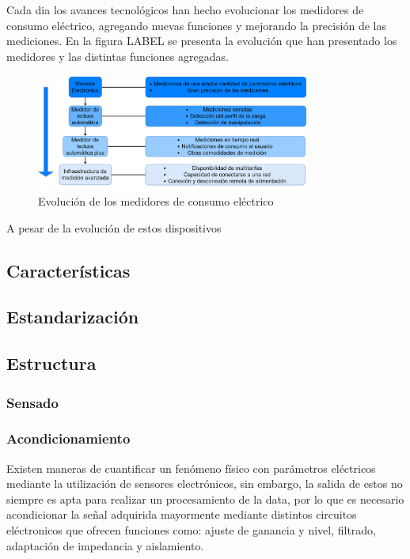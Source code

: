   \par Cada dia los avances tecnológicos han hecho evolucionar los medidores de consumo eléctrico, agregando nuevas funciones y mejorando la precisión de las mediciones. En la figura LABEL se presenta la evolución que han presentado los medidores y las distintas funciones agregadas.

  \begin{figure}[H]
    \centering
    \includegraphics[width=0.8\textwidth]{../Imagenes/Evolucion_medidores.png}
    \caption{Evolución de los medidores de consumo eléctrico}
    \label{fig:Evol_MI}
  \end{figure}

  \par A pesar de la evolución de estos dispositivos


  \subsection{Características}

  \subsection{Estandarización}

  \subsection{Estructura}
    \subsubsection{Sensado}
    \subsubsection{Acondicionamiento}
      \par Existen maneras de cuantificar un fenómeno físico con parámetros eléctricos
      mediante la utilización de sensores electrónicos, sin embargo, la salida de estos
      no siempre es apta para realizar un procesamiento de la data, por lo que es necesario
      acondicionar la señal adquirida mayormente mediante distintos circuitos eléctronicos
      que ofrecen funciones como: ajuste de ganancia y nivel, filtrado, adaptación de impedancia
      y aislamiento.


